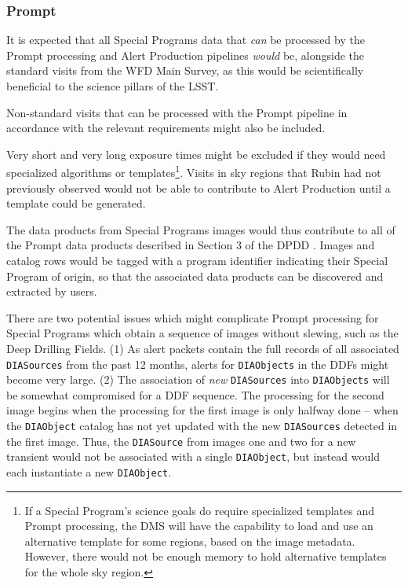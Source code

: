 \documentclass[DM,lsstdoc,toc]{lsstdoc}
\begin{document}
\subsubsection{Prompt}

It is expected that all Special Programs data that {\it can} be processed by the Prompt processing and Alert Production pipelines {\it would} be, alongside the standard visits from the WFD Main Survey, as this would be scientifically beneficial to the science pillars of the LSST.

Non-standard visits that can be processed with the Prompt pipeline in accordance with the relevant requirements might also be included.

Very short and very long exposure times might be excluded if they would need specialized algorithms or templates\footnote{If a Special Program's science goals do require specialized templates and Prompt processing, the DMS will have the capability to load and use an alternative template for some regions, based on the image metadata. However, there would not be enough memory to hold alternative templates for the whole sky region.}.
Visits in sky regions that Rubin had not previously observed would not be able to contribute to Alert Production until a template could be generated.

The data products from Special Programs images would thus contribute to all of the Prompt data products described in Section 3 of the DPDD . 
Images and catalog rows would be tagged with a program identifier indicating their Special Program of origin, so that the associated data products can be discovered and extracted by users.

There are two potential issues which might complicate Prompt processing for Special Programs which obtain a sequence of images without slewing, such as the Deep Drilling Fields.
(1) As alert packets contain the full records of all associated {\tt DIASources} from the past 12 months, alerts for {\tt DIAObjects} in the DDFs might become very large.
(2) The association of {\it new} {\tt DIASources} into {\tt DIAObjects} will be somewhat compromised for a DDF sequence.
The processing for the second image begins when the processing for the first image is only halfway done -- when the {\tt DIAObject} catalog has not yet updated with the new {\tt DIASources} detected in the first image.
Thus, the {\tt DIASource} from images one and two for a new transient would not be associated with a single {\tt DIAObject}, but instead would each instantiate a new {\tt DIAObject}.
\end{document}
